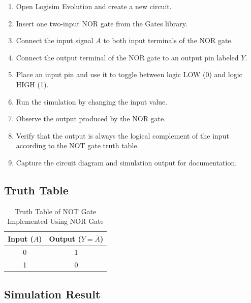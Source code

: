 \documentclass[12pt,a4paper]{article}
\begin{document}
\begin{enumerate}
    \item Open Logisim Evolution and create a new circuit.
    
    \item Insert one two-input NOR gate from the Gates library.
    
    \item Connect the input signal $A$ to both input terminals of the NOR gate.
    
    \item Connect the output terminal of the NOR gate to an output pin labeled $Y$.
    
    \item Place an input pin and use it to toggle between logic LOW (0) and logic HIGH (1).
    
    \item Run the simulation by changing the input value.
    
    \item Observe the output produced by the NOR gate.
    
    \item Verify that the output is always the logical complement of the input according to the NOT gate truth table.
    
    \item Capture the circuit diagram and simulation output for documentation.
\end{enumerate}


\subsection{Truth Table}

\begin{table}[H]
\centering
\caption{Truth Table of NOT Gate Implemented Using NOR Gate}
\label{tab:not_nor_truth}
\begin{tabular}{|c|c|}
\hline
Input ($A$) & Output ($Y=\overline{A}$) \\
\hline
0 & 1 \\
\hline
1 & 0 \\
\hline
\end{tabular}
\end{table}


\subsection{Simulation Result}
\end{document}

